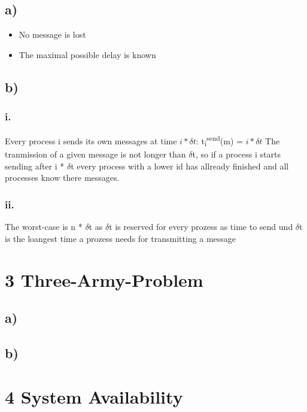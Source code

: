 \documentclass{scrartcl}
\begin{document}
\subsection*{a)}
\begin{itemize}
	\item No message is lost
	\item The maximal possible delay is known
\end{itemize}
\subsection*{b)}
\subsubsection*{i.}
Every process i sends its own messages at time $ i * \delta t$:
t\textsubscript{i}\textsuperscript{send}(m) = $ i * \delta t $
The tranmission of a given message is not longer than $ \delta $t, so if a process i starts sending after i * $ \delta $t every process with a lower id has allready finished and all processes know there messages.
\subsubsection*{ii.}
The worst-case is n * $ \delta $t as $ \delta $t is reserved for every prozess as time to send und $ \delta $t is the loangest time a prozess needs for transmitting a message


\section*{3 Three-Army-Problem}
\subsection*{a)}
\subsection*{b)}

\section*{4 System Availability}
\end{document}
